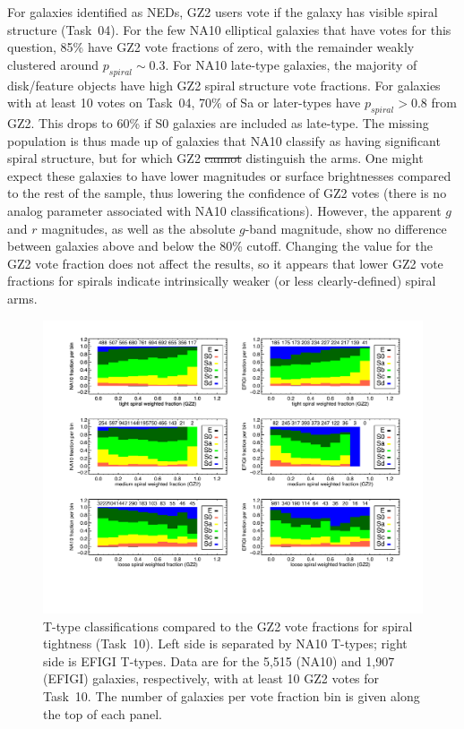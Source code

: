 \documentclass[useAMS,usenatbib]{mn2e}
\providecommand{\DIFaddtex}[1]{{\protect\color{blue}\uwave{#1}}} %
\providecommand{\DIFdeltex}[1]{{\protect\color{red}\sout{#1}}}                      %
\providecommand{\DIFaddbegin}{} %
\providecommand{\DIFaddend}{} %
\providecommand{\DIFdelbegin}{} %
\providecommand{\DIFdelend}{} %
\providecommand{\DIFadd}[1]{\texorpdfstring{\DIFaddtex{#1}}{#1}} %
\providecommand{\DIFdel}[1]{\texorpdfstring{\DIFdeltex{#1}}{}} %
\begin{document}
For galaxies identified as NEDs, GZ2 users vote if the galaxy has visible spiral structure (Task~04). For the few NA10 elliptical galaxies that have votes for this question, 85\% have GZ2 vote fractions of zero, with the remainder weakly clustered around $p_{spiral}\sim0.3$. For NA10 late-type galaxies, the majority of disk/feature objects have high GZ2 spiral structure vote fractions. For galaxies with at least 10 votes on Task~04, 70\% of Sa or later-types have $p_{spiral}>0.8$ from GZ2. This drops to 60\% if S0 galaxies are included as late-type. The missing population is thus made up of galaxies that NA10 classify as having significant spiral structure, but for which GZ2 \DIFdelbegin \DIFdel{cannot }\DIFdelend \DIFaddbegin \DIFadd{does not }\DIFaddend distinguish the arms. One might expect these galaxies to have lower magnitudes or surface brightnesses compared to the rest of the sample, thus lowering the confidence of GZ2 votes (there is no analog parameter associated with NA10 classifications). However, the apparent $g$ and $r$ magnitudes, as well as the absolute $g$-band magnitude, show no difference between galaxies above and below the 80\% cutoff. Changing the value for the GZ2 vote fraction does not affect the results, so it appears that lower GZ2 vote fractions for spirals indicate intrinsically weaker (or less clearly-defined) spiral arms.

\begin{figure}
\includegraphics[angle=0,width=7.0in]{figures/spiraltightness_color.pdf}
\caption{T-type classifications compared to the GZ2 vote fractions for spiral tightness (Task~10). Left side is separated by NA10 T-types; right side is EFIGI T-types. Data are for the 5,515 (NA10) and 1,907 (EFIGI) galaxies, respectively, with at least 10 GZ2 votes for Task~10. The number of galaxies per vote fraction bin is given along the top of each panel. 
\label{fig-spiraltightness}}
\end{figure}
\end{document}
